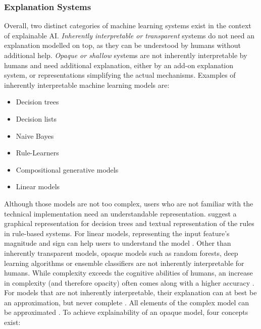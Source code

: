 \subsubsection{Explanation Systems}
\label{subsubsec:explanation_systems}
Overall, two distinct categories of machine learning systems exist in the context of explainable AI. \textit{Inherently interpretable or transparent} systems do not need an explanation modelled on top, as they can be understood by humans without additional help. \textit{Opaque or shallow} systems are not inherently interpretable by humans and need additional explanation, either by an add-on explanation system, or representations simplifying the actual mechanisms.\newline
Examples of inherently interpretable machine learning models are:
\begin{itemize}
	\item Decision trees \cite{biran2017explanation, kotsiantis2007supervised}
	\item Decision lists \cite{biran2017explanation}
	\item Naive Bayes \cite{kotsiantis2007supervised}
	\item Rule-Learners \cite{guidotti2018survey, kotsiantis2007supervised}
	\item Compositional generative models \cite{biran2017explanation}
	\item Linear models \cite{guidotti2018survey}
\end{itemize}
Although those models are not too complex, users who are not familiar with the technical implementation need an understandable representation. \cite{guidotti2018survey} suggest a graphical representation for decision trees and textual representation of the rules in rule-based systems. For linear models, representing the input feature's magnitude and sign can help users to understand the model \cite{guidotti2018survey}.\newline
Other than inherently transparent models, opaque models such as random forests, deep learning algorithms or ensemble classifiers are not inherently interpretable for humans. While complexity exceeds the cognitive abilities of humans, an increase in complexity (and therefore opacity) often comes along with a higher accuracy \cite{chen2018learning, richardson2018survey}. For models that are not inherently interpretable, their explanation can at best be an approximation, but never complete \cite{miller2017explanation}. All elements of the complex model can be approximated \cite{miller2017explanation}. To achieve explainability of an opaque model, four concepts exist:
